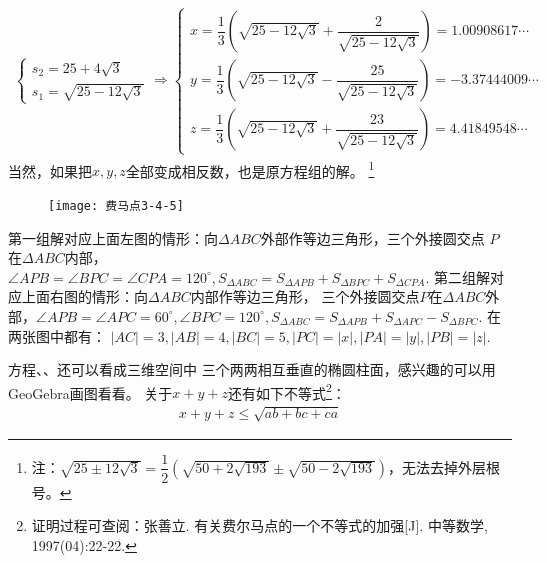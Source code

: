 \begin{enumerate}[label={【\textbf{例\thechapter.\arabic*}】},
 leftmargin=\inteval{\myenumleftmargin}pt,
 itemsep=\inteval{\myenumitempsep}pt,
 itemindent=\inteval{\myenumitemindent}pt]
\begin{align*}
\begin{cases}
        s_2 = 25+ 4\sqrt{3} \\
        s_1=\sqrt{25 - 12\sqrt{3}}
    \end{cases}
    \Rightarrow 
    \begin{cases}
        x =\dfrac{1}{3}\left(\sqrt{25 - 12\sqrt{3}}+
        \dfrac{2}{\sqrt{25 - 12\sqrt{3}}}\right)=1.00908617 \cdots \\
        y =\dfrac{1}{3}\left(\sqrt{25 - 12\sqrt{3}}-
        \dfrac{25}{\sqrt{25 - 12\sqrt{3}}}\right)=-3.37444009 \cdots \\
        z =\dfrac{1}{3}\left(\sqrt{25 - 12\sqrt{3}}+
        \dfrac{23}{\sqrt{25 - 12\sqrt{3}}}\right)= 4.41849548 \cdots 
    \end{cases}
\end{align*}
当然，如果把$ x,y,z $全部变成相反数，也是原方程组的解。
\footnote{注：$ \sqrt{25\pm 12\sqrt{3}} =\dfrac{1}{2}\left(\sqrt{50+2\sqrt{193}}
    \pm \sqrt{50-2\sqrt{193}}\right) $，无法去掉外层根号。}

\begin{figure}[H]
    \centering
    \texttt{[image: 费马点3-4-5]}
\end{figure} 
第一组解对应上面左图的情形：向$ \Delta ABC $外部作等边三角形，三个外接圆交点
$ P $在$ \Delta ABC $内部，$ \angle APB=\angle BPC =\angle CPA
=120^{\circ} ,S_{\Delta ABC}=S_{\Delta APB}+S_{\Delta BPC}+S_{\Delta CPA}$.
第二组解对应上面右图的情形：向$ \Delta ABC $内部作等边三角形，
三个外接圆交点$ P $在$ \Delta ABC $外部，$ \angle APB=\angle APC
=60^{\circ},\angle BPC=120^{\circ},S_{\Delta ABC}=S_{\Delta APB}+
S_{\Delta APC}-S_{\Delta BPC} $. 在两张图中都有：
$ |AC|=3,|AB|=4,|BC|=5, |PC|=|x|,|PA|=|y|,|PB|=|z| $. 


方程、、还可以看成三维空间中
三个两两相互垂直的椭圆柱面，感兴趣的可以用GeoGebra画图看看。
关于$ x+y+z $还有如下不等式\footnote{证明过程可查阅：张善立.
    有关费尔马点的一个不等式的加强[J]. 中等数学, 1997(04):22-22.}：
\begin{gather*}
    x+y+z\leq \sqrt{ab+bc+ca}
\end{gather*} 


\end{enumerate}
